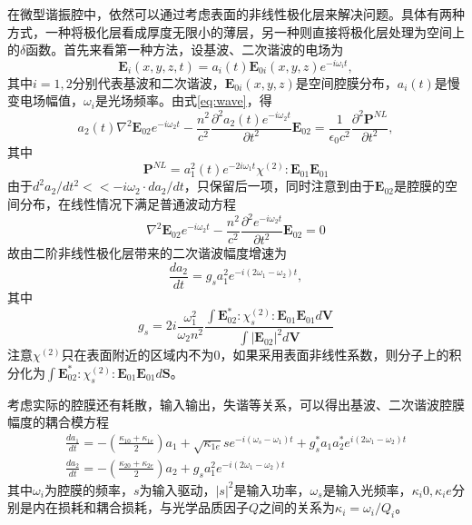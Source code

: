 \documentclass[UTF8,a4paper,cs4size,hyperref]{ctexart}
\begin{document}
在微型谐振腔中，依然可以通过考虑表面的非线性极化层来解决问题。具体有两种方式，一种将极化层看成厚度无限小的薄层，另一种则直接将极化层处理为空间上的$\delta$函数。首先来看第一种方法，设基波、二次谐波的电场为
\begin{equation}
\mathbf{E}_i(x,y,z,t) = a_i(t)\mathbf{E}_{0i} (x,y,z)e^{-i\omega_it},
\end{equation}
其中$i = 1, 2$分别代表基波和二次谐波，$\mathbf{E}_{0i} (x,y,z)$是空间腔膜分布，$a_i(t)$是慢变电场幅值，$\omega_i$是光场频率。由式\ref{eq:wave}，得
\begin{equation}
a_2(t)\nabla^2\mathbf{E}_{02}e^{-i\omega_2t}-\frac{n^2}{c^2}\frac{\partial^2a_2(t)e^{-i\omega_2t}}{\partial t^2}\mathbf{E}_{02} = \frac{1}{\epsilon_0c^2}\frac{\partial^2\mathbf{P}^{NL}}{\partial t^2},
\end{equation}
其中
\begin{equation}
\mathbf{P}^{NL} = a_1^2(t)e^{-2i\omega_1t}\chi^{(2)}:\mathbf{E}_{01}\mathbf{E}_{01}
\end{equation}
由于$d^2 a_2/d t^2 << -i\omega_2\cdot d a_2/d t $，只保留后一项，同时注意到由于$\mathbf{E}_{02}$是腔膜的空间分布，在线性情况下满足普通波动方程
\begin{equation}
\nabla^2\mathbf{E}_{02}e^{-i\omega_2t}-\frac{n^2}{c^2}\frac{\partial^2e^{-i\omega_2t}}{\partial t^2}\mathbf{E}_{02} = 0 
\end{equation}
故由二阶非线性极化层带来的二次谐波幅度增速为
\begin{equation}
\frac{da_2}{dt} = g_sa_1^2e^{-i(2\omega_1-\omega_2)t},
\end{equation}
其中
\begin{equation}
g_s = 2i\frac{\omega_1^2}{\omega_2n^2}\frac{\int \mathbf{E}_{02}^*:\chi^{(2)}_s:\mathbf{E}_{01}\mathbf{E}_{01} d\mathbf{V}}{\int |\mathbf{E}_{02}|^2 d\mathbf{V}}
\end{equation}
注意$\chi^{(2)}$只在表面附近的区域内不为0，如果采用表面非线性系数，则分子上的积分化为$\int \mathbf{E}_{02}^*:\chi_s^{(2)}:\mathbf{E}_{01}\mathbf{E}_{01} d\mathbf{S}$。

考虑实际的腔膜还有耗散，输入输出，失谐等关系，可以得出基波、二次谐波腔膜幅度的耦合模方程\cite{haus1991coupled}
\begin{gather}
\label{eq:cpmode}
\frac{da_1}{dt} = -(\frac{\kappa_{10}+\kappa_{1e}}{2} )a_1+\sqrt{\kappa_{1e}}se^{-i(\omega_s-\omega_1)t}+g_s^*a_1a_2^*e^{i(2\omega_1-\omega_2)t} \\
\frac{da_2}{dt} = -(\frac{\kappa_{20}+\kappa_{2e}}{2})a_2+g_sa_1^2e^{-i(2\omega_1-\omega_2)t}
\end{gather}
其中$\omega_i$为腔膜的频率，$s$为输入驱动，$|s|^2$是输入功率，$\omega_s$是输入光频率，$\kappa_i0, \kappa_ie$分别是内在损耗和耦合损耗，与光学品质因子$Q$之间的关系为$\kappa_i = \omega_i/Q_i$。
\end{document}
